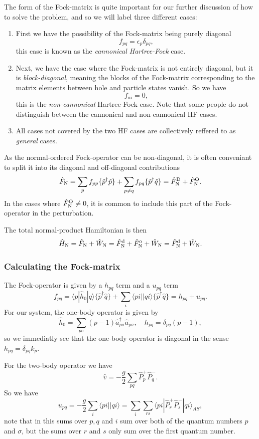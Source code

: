 \documentclass[a4paper, 11pt, notitlepage, english]{article}
\newcommand{\brakket}[2]{\langle #1 || #2 \rangle}
\newcommand{\op}[1]{\hat{#1}}
\newcommand{\braopket}[3]{\langle #1 | {#2} | #3 \rangle}
\newcommand{\eps}{\epsilon}
\begin{document}
The form of the Fock-matrix is quite important for our further discussion of how to solve the problem, and so we will label three different cases:
\begin{enumerate}
	\item First we have the possibility of the Fock-matrix being purely diagonal
	$$f_{pq} = \eps_p \delta_{pq},$$
	this case is known as the \emph{cannonical Hartree-Fock} case.
	\item Next, we have the case where the Fock-matrix is not entirely diagonal, but it is \emph{block-diagonal}, meaning the blocks of the Fock-matrix corresponding to the matrix elements between hole and particle states vanish. So we have
	$$f_{ai} = 0,$$
	this is the \emph{non-cannonical} Hartree-Fock case. Note that some people do not distinguish between the cannonical and non-cannonical HF cases.
	\item All cases not covered by the two HF cases are collectively reffered to as \emph{general} cases.
\end{enumerate}
As the normal-ordered Fock-operator can be non-diagonal, it is often conveniant to split it into its diagonal and off-diagonal contributions
$$\op{F}_{\rm N} = \sum_p f_{pp}\{\op{p}^\dagger \op{p}\} + \sum_{p\neq q} f_{pq}\{\op{p}^\dagger \op{q}\} = \op{F}_{\rm N}^{\rm D} + \op{F}_{\rm N}^{\rm O}.$$
In the cases where $\op{F}_{\rm N}^{\rm O} \neq 0$, it is common to include this part of the Fock-operator in the perturbation.

The total normal-product Hamiltonian is then
$$\op{H}_{\rm N} = \op{F}_{\rm N} + \op{W}_{\rm N} = \op{F}^{\rm d}_{\rm N} + \op{F}^{\rm o}_{\rm N} + \op{W}_{\rm N} = \op{F}^{\rm d}_{\rm N} + \tilde{W}_{\rm N}.$$

\subsubsection*{Calculating the Fock-matrix}

The Fock-operator is given by a $h_{pq}$ term and a $u_{pq}$ term
$$f_{pq} = \braopket{p}{\op{h}_0}{q}\{\op{p}^\dag \op{q}\}  + \sum_{i} \brakket{pi}{qi}\{\op{p}^\dag \op{q}\} = h_{pq} + u_{pq}.$$
For our system, the one-body operator is given by
$$\op{h}_0 = \sum_{p\sigma} (p-1)\op{a}_{p\sigma}^\dagger \op{a}_{p\sigma}, \quad h_{pq} = \delta_{pq} (p-1),$$
so we immediatly see that the one-body operator is diagonal in the sense $h_{pq} = \delta_{pq} k_p$.

For the two-body operator we have 
$$\op{v} = -\frac{g}{2}\sum_{pq}\op{P}_{p}^+ \op{P}_{q}^-.$$
So we have
$$u_{pq} = -\frac{g}{2} \sum_{i} \brakket{pi}{qi} = \sum_i\sum_{rs} \braopket{pi}{\op{P}_{r}^+ \op{P}_{s}^-}{qi}_{AS},$$
note that in this sums over $p, q$ and $i$ sum over both of the quantum numbers $p$ and $\sigma$, but the sums over $r$ and $s$ only sum over the first quantum number.
\end{document}
